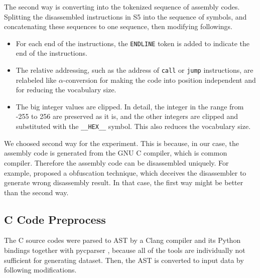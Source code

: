 \documentclass[senior,final,11pt]{iscs-thesis}
\begin{document}
The second way is converting into the tokenized sequence of assembly codes. 
Splitting the disassembled instructions in S5 into the sequence of symbols, and concatenating these sequences to one sequence, then modifying followings.
\begin{itemize}
\item For each end of the instructions, the \texttt{ENDLINE} token is added to indicate the end of the instructions.
\item 
The relative addressing, such as the address of \texttt{call} or \texttt{jump} instructions, 
are relabeled like $\alpha$-conversion for making the code into position independent and for reducing the vocabulary size.
\item The big integer values are clipped. 
In detail, the integer in the range from -255 to 256 are preserved as it is, and the other integers are clipped and substituted with the \texttt{\_\_HEX\_\_} symbol.
This also reduces the vocabulary size.
\end{itemize}

We choosed second way for the experiment.
This is because, in our case, the assembly code is generated from the GNU C compiler, which is common compiler.
Therefore the assembly code can be disassembled uniquely.
For example, \citet{disasm_obfuscate} proposed a obfuscation technique, which deceives the disassembler to generate wrong disassembly result.
In that case, the first way might be better than the second way.

\subsection{C Code Preprocess}
The C source codes were parsed to AST by a Clang compiler \citep{clang} and its Python bindings together with pycparser \citep{pycparser}, 
because all of the tools are individually not sufficient for generating dataset.
Then, the AST is converted to input data by following modifications.
\end{document}
